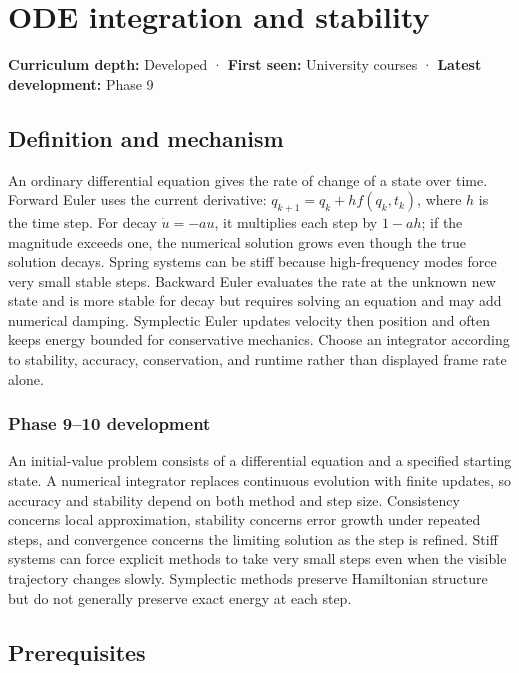 \hypertarget{appendix-18eacf61a04b}{}
\section{ODE integration and stability}\label{appendix-18eacf61a04b-ode-integration-and-stability}

\textbf{Curriculum depth:} Developed · \textbf{First seen:} University courses · \textbf{Latest development:} Phase 9

\subsection{Definition and mechanism}\label{appendix-18eacf61a04b-definition-and-mechanism}

An ordinary differential equation gives the rate of change of a state over time. Forward Euler uses the current derivative: \(q_{k+1}=q_k+h f(q_k,t_k)\), where \(h\) is the time step. For decay \(\dot u=-au\), it multiplies each step by \(1-ah\); if the magnitude exceeds one, the numerical solution grows even though the true solution decays. Spring systems can be stiff because high-frequency modes force very small stable steps. Backward Euler evaluates the rate at the unknown new state and is more stable for decay but requires solving an equation and may add numerical damping. Symplectic Euler updates velocity then position and often keeps energy bounded for conservative mechanics. Choose an integrator according to stability, accuracy, conservation, and runtime rather than displayed frame rate alone.

\subsubsection{Phase 9--10 development}\label{appendix-18eacf61a04b-phase-910-development}

An initial-value problem consists of a differential equation and a specified starting state. A numerical integrator replaces continuous evolution with finite updates, so accuracy and stability depend on both method and step size. Consistency concerns local approximation, stability concerns error growth under repeated steps, and convergence concerns the limiting solution as the step is refined. Stiff systems can force explicit methods to take very small steps even when the visible trajectory changes slowly. Symplectic methods preserve Hamiltonian structure but do not generally preserve exact energy at each step.

\subsection{Prerequisites}\label{appendix-18eacf61a04b-prerequisites}


